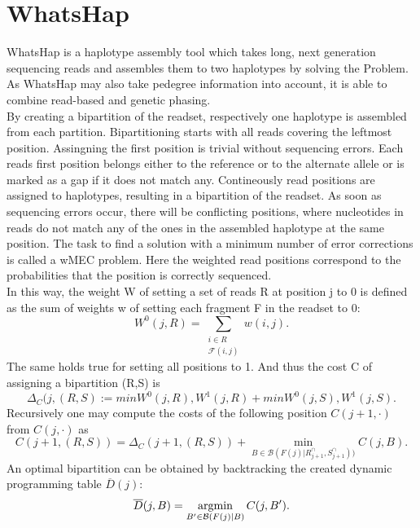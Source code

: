 \section{WhatsHap}
\label{section:WhatsHap}
WhatsHap is a haplotype assembly tool which takes long, next generation sequencing reads and assembles them to two haplotypes by solving the  Problem. As WhatsHap may also take pedegree information into account, it is able to combine read-based and genetic phasing. \cite{Shilpa}\\
By creating a bipartition of the readset, respectively one haplotype is assembled from each partition. Bipartitioning starts with all reads covering the leftmost position. Assingning the first position is trivial without sequencing errors. Each reads first position belongs either to the reference or to the alternate allele or is marked as a gap if it does not match any. Contineously read positions are assigned to haplotypes, resulting in a bipartition of the readset. As soon as sequencing errors occur, there will be conflicting positions, where nucleotides in reads do not match any of the ones in the assembled haplotype at the same position. The task to find a solution with a minimum number of error corrections is called a \ac{wMEC} problem. Here the weighted read positions correspond to the probabilities that the position is correctly sequenced. \cite{WhatsHap}\\
In this way, the weight W of setting a set of reads R at position j to 0 is defined as the sum of weights w of setting each fragment F in the readset to 0:
\begin{equation}
W^{0}(j,R)= \sum_{\substack{i\in R\\ \mathcal{F}(i,j)}}w(i,j).
\end{equation}
The same holds true for setting all positions to 1. And thus the cost C of assigning a bipartition (R,S) is
\begin{equation}
\Delta_{C}(j,(R,S):= min{W^{0}(j,R),W^{1}(j,R)} + min{ W^{0}(j,S),W^{1}(j,S)} .
\end{equation}
Recursively one may compute the costs of the following position \( C(j+1,\cdot) \) from \( C(j,\cdot) \) as
\begin{equation}
C(j+1,(R,S))=\Delta_{C}(j+1,(R,S))+ \min_{B\in \mathcal{B}(F(j)|R^{\cap}_{j+1},S^{\cap}_{j+1}))}C(j,B).
\end{equation}
An optimal bipartition can be obtained by backtracking the created dynamic programming table \(\overline{D}(j)\):
\begin{equation}
\overline{D}(j,B)= \mathop{\mathrm{argmin}}_{B'\in \mathcal{B}(F(j)|B)}C(j,B').
\end{equation}
